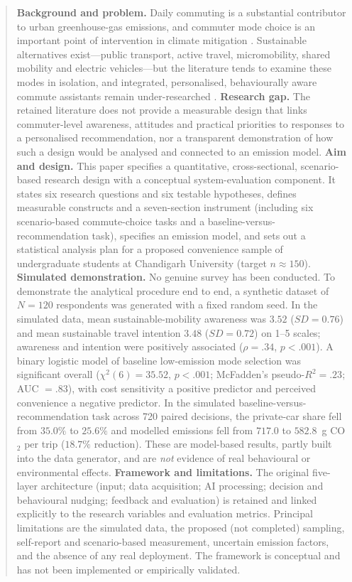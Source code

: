 \documentclass[11pt,a4paper]{article}
\begin{document}
\vspace{0.5em}
\begin{abstract}
\noindent
\textbf{Background and problem.} Daily commuting is a substantial contributor to urban greenhouse-gas
emissions, and commuter mode choice is an important point of intervention in climate mitigation
\citep{eslami2025,creutzig2015}. Sustainable alternatives exist---public transport, active travel,
micromobility, shared mobility and electric vehicles---but the literature tends to examine these
modes in isolation, and integrated, personalised, behaviourally aware commute assistants remain
under-researched \citep{kashem2025,ouyang2025}. \textbf{Research gap.} The retained literature does
not provide a measurable design that links commuter-level awareness, attitudes and practical
priorities to responses to a personalised recommendation, nor a transparent demonstration of how such
a design would be analysed and connected to an emission model. \textbf{Aim and design.} This paper
specifies a quantitative, cross-sectional, scenario-based research design with a conceptual
system-evaluation component. It states six research questions and six testable hypotheses, defines
measurable constructs and a seven-section instrument (including six scenario-based commute-choice
tasks and a baseline-versus-recommendation task), specifies an emission model, and sets out a
statistical analysis plan for a proposed convenience sample of undergraduate students at Chandigarh
University (target $n \approx 150$). \textbf{Simulated demonstration.} No genuine survey has been
conducted. To demonstrate the analytical procedure end to end, a synthetic dataset of $N = 120$
respondents was generated with a fixed random seed. In the simulated data, mean sustainable-mobility
awareness was $3.52$ ($SD = 0.76$) and mean sustainable travel intention $3.48$ ($SD = 0.72$) on 1--5
scales; awareness and intention were positively associated ($\rho = .34$, $p < .001$). A binary
logistic model of baseline low-emission mode selection was significant overall ($\chi^2(6) = 35.52$,
$p < .001$; McFadden's pseudo-$R^2 = .23$; AUC $= .83$), with cost sensitivity a positive predictor
and perceived convenience a negative predictor. In the simulated baseline-versus-recommendation task
across 720 paired decisions, the private-car share fell from $35.0\%$ to $25.6\%$ and modelled
emissions fell from $717.0$ to $582.8$~g CO$_2$ per trip ($18.7\%$ reduction). These are model-based
results, partly built into the data generator, and are \emph{not} evidence of real behavioural or
environmental effects. \textbf{Framework and limitations.} The original five-layer architecture
(input; data acquisition; AI processing; decision and behavioural nudging; feedback and evaluation)
is retained and linked explicitly to the research variables and evaluation metrics. Principal
limitations are the simulated data, the proposed (not completed) sampling, self-report and
scenario-based measurement, uncertain emission factors, and the absence of any real deployment. The
framework is conceptual and has not been implemented or empirically validated.


\end{abstract}
\end{document}
